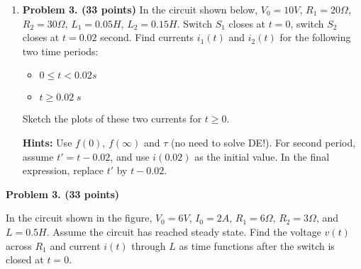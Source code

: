 \begin{enumerate}
\item {\bf Problem 3. (33 points)} In the circuit shown below, $V_0=10V$,
$R_1=20\Omega$, $R_2=30\Omega$, $L_1=0.05H$, $L_2=0.15H$. Switch $S_1$ 
closes at $t=0$, switch $S_2$ closes at $t=0.02$ second. Find currents 
$i_1(t)$ and $i_2(t)$ for the following two time periods:
\begin{itemize}
\item $0\le t < 0.02 s$
\item $t \ge 0.02\;s$ 
\end{itemize}
Sketch the plots of these two currents for $t \ge 0$.

{\bf Hints:} Use $f(0)$, $f(\infty)$ and $\tau$ (no need to solve DE!).
For second period, assume $t'=t-0.02$, and use $i(0.02)$ as the initial 
value. In the final expression, replace $t'$ by $t-0.02$.


% 
% 
% 




\end{enumerate}



\item {\bf Problem 3. (33 points)} 

In the circuit shown in the figure, $V_0=6V$, $I_0=2A$, $R_1=6\Omega$, 
$R_2=3\Omega$, and $L=0.5H$. Assume the circuit has reached steady state.
Find the voltage $v(t)$ across $R_1$ and current $i(t)$ through $L$ as 
time functions after the switch is closed at $t=0$.



